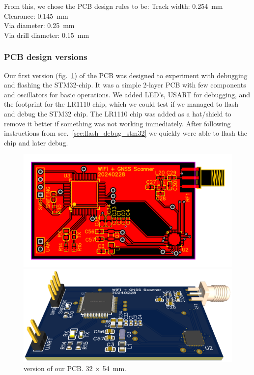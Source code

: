 From this, we chose the \ac{PCB} design rules to be:
Track width: \SI{0.254}{\milli\meter} \\
Clearance: \SI{0.145}{\milli\meter} \\
Via diameter: \SI{0.25}{\milli\meter} \\
Via drill diameter: \SI{0.15}{\milli\meter}

\subsubsection{PCB design versions}
Our first version (fig.~\ref{fig:pcb_v1}) of the \ac{PCB} was designed to experiment with debugging and flashing the STM32-chip. It was a simple 2-layer \ac{PCB} with few components and oscillators for basic operations. We added \ac{LED}'s, \ac{USART} for debugging, and the footprint for the LR1110 chip, which we could test if we managed to flash and debug the STM32 chip. The LR1110 chip was added as a hat/shield to remove it better if something was not working immediately. After following instructions from sec.~\ref{sec:flash_debug_stm32} we quickly were able to flash the chip and later debug.

\begin{figure}[H]
    \centering
    \begin{minipage}[c]{0.49\textwidth}
        \centering
        \includegraphics[width=\textwidth]{figures/PCB_v1.png}
    \end{minipage}
    \hfill
    \begin{minipage}[c]{0.49\textwidth}
        \centering
        \includegraphics[width=\textwidth]{figures/PCB_v1_3D.png}
    \end{minipage}
    \caption{ version of our PCB. \si{32} $\times$ \SI{54}{\milli\meter}.}
    \label{fig:pcb_v1}
\end{figure}

